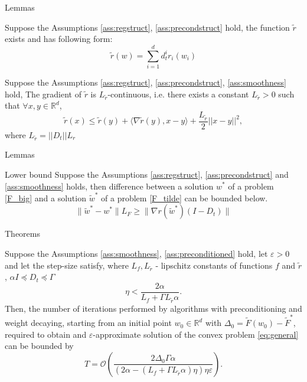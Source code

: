 \documentclass[aspectratio=169, 12pt]{beamer}
\begin{document}
\begin{frame}{Lemmas}
    \begin{lemma}
    Suppose the Assumptions \ref{ass:regstruct}, \ref{ass:precondstruct} hold, the function $\widetilde{r}$ exists and has following form:
    $$\widetilde{r}(w) = \sum_{i=1}^d d_t^i r_i(w_i)$$
\end{lemma}

\begin{lemma}
Suppose the Assumptions \ref{ass:regstruct}, \ref{ass:precondstruct}, \ref{ass:smoothness} hold,
The gradient of $\widetilde{r}$ is $L_{\tilde{r}}$-continuous, i.e.  there exists a constant $L_{\tilde{r}} > 0$ such that $\forall x, y \in \mathbb{R}^d$,
    	\begin{equation*}
    		\widetilde{r}(x) \leq \widetilde{r}(y) + \langle \nabla \widetilde{r}(y), x-y \rangle + \frac{L_{\tilde{r}}}{2} ||x - y||^2,
    	\end{equation*}
     where $L_{\tilde{r}} = ||D_t|| L_r$
\end{lemma}
\end{frame}
\begin{frame}{Lemmas}
    \begin{lemma}\label{lemma:lowerbondF}{Lower bound}
Suppose the Assumptions \ref{ass:regstruct}, \ref{ass:precondstruct} and \ref{ass:smoothness} holds, then difference between a solution $w^*$ of a problem \eqref{F_big} and a solution $\widetilde{w}^*$ of a problem \eqref{F_tilde} can be bounded below.
    \begin{equation*}
        \|\widetilde{w}^* - w^* \| L_F \geq \| \nabla r (\widetilde{w}^*) (I - D_t)\|
    \end{equation*}
\end{lemma}
\end{frame}
\fi 

\begin{frame}{Theorems}
\begin{theorem}[1]
\label{theor:1}
    Suppose the Assumptions \ref{ass:smoothness}, \ref{ass:preconditioned} hold, let $\varepsilon > 0$ and let the step-size satisfy, where $L_f, L_{\tilde{r}}$ - lipschitz constants of functions $f$ and $\tilde{r}$, $\alpha I \preccurlyeq D_t \preccurlyeq \Gamma$
    \begin{equation*}
        \eta < \frac{2 \alpha}{L_f + \Gamma L_{\tilde{r}} \alpha}.
    \end{equation*}
    Then, the number of iterations performed by algorithms with preconditioning and weight decaying, starting from an initial point $w_0 \in \mathbb{R}^d$ with $\Delta_0 = \tilde{F}(w_0) - \tilde{F}^*$, required to obtain and $\varepsilon$-approximate solution of the convex problem \eqref{eq:general} can be bounded by
    \begin{equation*}
          T = \mathcal{O}\left( \frac{2\Delta_0 \Gamma \alpha } {\left(2\alpha - \left( L_f + \Gamma L_{\tilde{r}} \alpha \right)\eta \right) \eta \varepsilon} \right).
    \end{equation*}
\end{theorem}
\end{frame}
\end{document}
